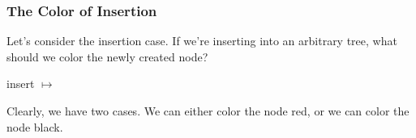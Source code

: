 \documentclass[aspectratio=169, handout]{beamer}
\begin{document}
\begin{frame}
  \frametitle{The Color of Insertion}

  Let's consider the insertion case. If we're inserting into an arbitrary tree, what should
  we color the newly created node?

  \pause
  \vspace{\fill}

  \begin{center}
    \begin{minipage}{0.33\textwidth}
      \begin{adjustbox}{center}
      \end{adjustbox}
    \end{minipage}
  \pause
    \begin{minipage}{0.15\textwidth}
      \begin{center}
        insert  $\mapsto$
      \end{center}
    \end{minipage}
    \begin{minipage}{0.33\textwidth}
        \begin{adjustbox}{center}
        \end{adjustbox}
    \end{minipage}
  \end{center}

  \pause
  \vspace{\fill}

  Clearly, we have two cases. We can either color the node red, or we can color
  the node black.
\end{frame}
\end{document}
